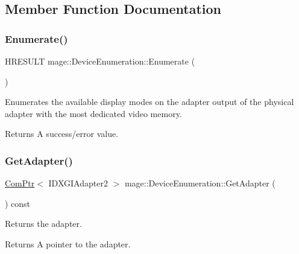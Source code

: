\subsection{Member Function Documentation}
\hypertarget{classmage_1_1_device_enumeration_a4fea0ffef733632456b281f74608a239}{}\label{classmage_1_1_device_enumeration_a4fea0ffef733632456b281f74608a239} 
\subsubsection{\texorpdfstring{Enumerate()}{Enumerate()}}
{\footnotesize\ttfamily H\+R\+E\+S\+U\+LT mage\+::\+Device\+Enumeration\+::\+Enumerate (\begin{DoxyParamCaption}{ }\end{DoxyParamCaption})\hspace{0.3cm}{\ttfamily [private]}}

Enumerates the available display modes on the adapter output of the physical adapter with the most dedicated video memory.

\begin{DoxyReturn}{Returns}
A success/error value. 
\end{DoxyReturn}
\hypertarget{classmage_1_1_device_enumeration_ad8a0702abdc70ea8fc1b6e46544839a1}{}\label{classmage_1_1_device_enumeration_ad8a0702abdc70ea8fc1b6e46544839a1} 
\subsubsection{\texorpdfstring{Get\+Adapter()}{GetAdapter()}}
{\footnotesize\ttfamily \hyperlink{namespacemage_ae74f374780900893caa5555d1031fd79}{Com\+Ptr}$<$ I\+D\+X\+G\+I\+Adapter2 $>$ mage\+::\+Device\+Enumeration\+::\+Get\+Adapter (\begin{DoxyParamCaption}{ }\end{DoxyParamCaption}) const}

Returns the adapter.

\begin{DoxyReturn}{Returns}
A pointer to the adapter. 
\end{DoxyReturn}
\hypertarget{classmage_1_1_device_enumeration_a533ac2f6ea91604a3ea3cc8d93c3de87}{}\label{classmage_1_1_device_enumeration_a533ac2f6ea91604a3ea3cc8d93c3de87} 
